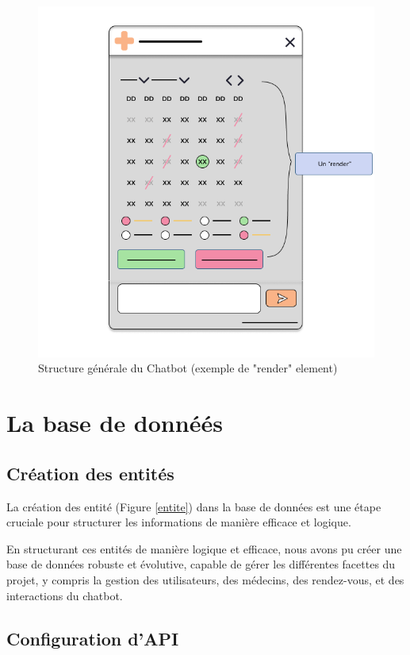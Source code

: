 \begin{figure}[H] 
    \centering
    \includegraphics[scale=0.45]{Figures/cbs_render.png}
    \caption{Structure générale du Chatbot (exemple de "render" element)}
\end{figure}

\section{La base de donnéés}


\subsection{Création des entités}

\hspace{16pt}La création des entité (Figure \ref{entite}) dans la base de données est une étape cruciale pour structurer les informations de manière efficace et logique.

En structurant ces entités de manière logique et efficace, nous avons pu créer une base de données robuste et évolutive, capable de gérer les différentes facettes du projet, y compris la gestion des utilisateurs, des médecins, des rendez-vous, et des interactions du chatbot.

\subsection{Configuration d'API}

